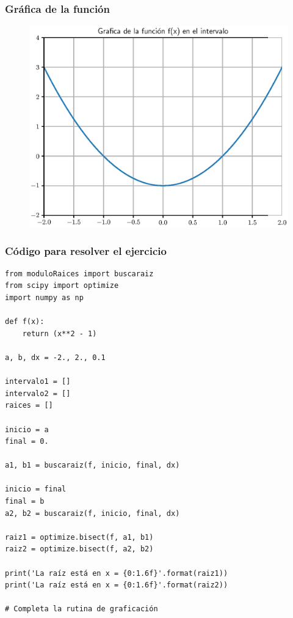 \documentclass[12pt]{beamer}
\begin{document}
\begin{frame}
\frametitle{Gráfica de la función}
\begin{figure}
    \centering
    \includegraphics[scale=0.55]{Imagenes/raices_scipy_bisect_01.eps}
\end{figure}
\end{frame}
\begin{frame}
\frametitle{Código para resolver el ejercicio}
\begin{lstlisting}[caption=Código para usar optimize.bisect]
from moduloRaices import buscaraiz
from scipy import optimize
import numpy as np

def f(x):
    return (x**2 - 1)

a, b, dx = -2., 2., 0.1

intervalo1 = []
intervalo2 = []
raices = []

inicio = a
final = 0.

a1, b1 = buscaraiz(f, inicio, final, dx)

inicio = final
final = b
a2, b2 = buscaraiz(f, inicio, final, dx)

raiz1 = optimize.bisect(f, a1, b1)
raiz2 = optimize.bisect(f, a2, b2)

print('La raíz está en x = {0:1.6f}'.format(raiz1))
print('La raíz está en x = {0:1.6f}'.format(raiz2))

# Completa la rutina de graficación
\end{lstlisting}
\end{frame}
\end{document}
